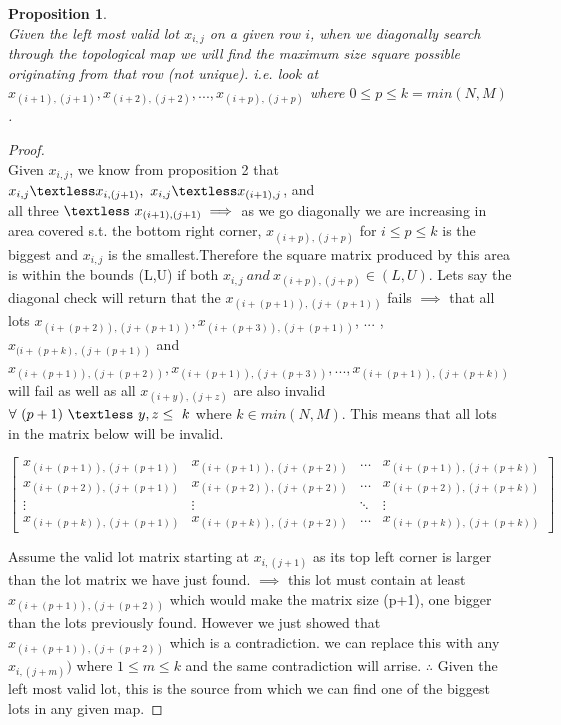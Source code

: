 \documentclass[12pt]{article}
\newtheorem{proposition}[theorem]{Proposition}
\begin{document}
\begin{proposition}
~ \\ \indent Given the left most valid lot $x_{i,j}$ on a given row $i$, when we diagonally search through the topological map
we will find the maximum size square possible originating from that row (not unique). i.e. look at $x_{(i+1),(j+1)}
,x_{(i+2),(j+2)},...,x_{(i+p),(j+p)}$ where $0 \leq p \leq k = min(N,M)$.
\end{proposition}

\begin{proof}
~ \\ \indent Given $x_{i,j}$, we know from proposition 2 that $x_{i,j} \textless x_{i,(j+1)},\ x_{i,j}
\textless x_{(i+1),j}$, and \\ all three $\textless\ x_{(i+1),(j+1)} \implies$ as we go diagonally we are increasing
in area covered s.t. the bottom right corner, $x_{(i+p),(j+p)}$ for $i \le p \le k$ is the biggest and $x_{i,j}$ is
the smallest.Therefore the square matrix produced by this area is within the bounds (L,U) if both $x_{i,j}
\ and\ x_{(i+p),(j+p)} \in (L,U)$. Lets say the diagonal check will return that the $x_{(i+(p+1)),(j+(p+1))}$ fails
$\implies$ that all lots $x_{(i+(p+2)),(j+(p+1))},x_{(i+(p+3)),(j+(p+1))}$, ... ,$x_{(i+(p+k),(j+(p+1))}$ and
$x_{(i+(p+1)),(j+(p+2))}, x_{(i+(p+1)),(j+(p+3))},...,x_{(i+(p+1)),(j+(p+k))}$ will fail as well as all
$x_{(i+y),(j+z)}$ are also invalid $\forall\ (p+1)\ \textless\ y,z \leq\ k$ where $k \in min(N,M)$. This means that
all lots in the matrix below will be invalid.
\begin{center}
$
\begin{bmatrix}
    x_{(i+(p+1)),(j+(p+1))} & x_{(i+(p+1)),(j+(p+2))} & \dots  & x_{(i+(p+1)),(j+(p+k))} \\
    x_{(i+(p+2)),(j+(p+1))} & x_{(i+(p+2)),(j+(p+2))} & \dots  & x_{(i+(p+2)),(j+(p+k))} \\
    \vdots                  & \vdots                  & \ddots & \vdots                  \\
    x_{(i+(p+k)),(j+(p+1))} & x_{(i+(p+k)),(j+(p+2))} & \dots  & x_{(i+(p+k)),(j+(p+k))}
\end{bmatrix}
$
\end{center}
Assume the valid lot matrix starting at $x_{i,(j+1)}$ as its top left corner is larger than the lot matrix we have just
found. $\implies$ this lot must contain at least $x_{(i+(p+1)),(j+(p+2))}$ which would make the matrix size
(p+1), one bigger than the lots previously found. However we just showed that $x_{(i+(p+1)),(j+(p+2))}$ which is a
contradiction. we can replace this with any $x_{i,(j+m)})$ where $1 \leq m \leq k$ and the same contradiction will
arrise. $\therefore$ Given the left most valid lot, this is the source from which we can find one of the biggest lots
in any given map.
\end{proof}
\end{document}

